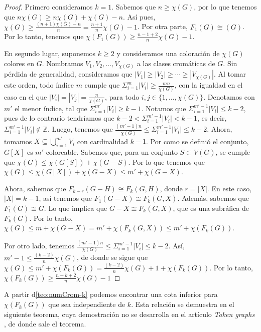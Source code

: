 \begin{proof}
    Primero consideramos $k=1$. Sabemos que $n \geq \chi(G)$, por lo que tenemos
    que $n\chi(G) \geq n\chi(G) + \chi(G) -n$. As\'i pues, $\chi (G) \geq
    \frac{(n+1)\chi(G)-n}{n} = \frac{n+1}{n}\chi (G) -1$. Por otra parte,
    $F_1(G) \cong (G)$. Por lo tanto, tenemos que $\chi(F_1(G)) \geq
    \frac{n-1+2}{n} \chi(G) -1$.
        
    En segundo lugar, suponemos $k \geq 2$ y consideramos una coloraci\'on de
    $\chi(G)$ colores en $G$. Nombramos $V_1, V_2, \dots, V_{\chi(G)}$ a las
    clases crom\'aticas de $G$. Sin p\'erdida de generalidad, consideramos que
    $|V_1|\geq |V_2|\geq \cdots \geq |V_{\chi(G)}|$. Al tomar este orden, todo
    \'indice $m$ cumple que $\Sigma_{i=1}^{m}|V_i| \geq \frac{mn}{\chi(G)}$, con
    la igualdad en el caso en el que $|V_i| = |V_j| = \frac{n}{\chi(G)}$, para
    todo $i,j \in \{1, \dots, \chi(G)\}$. Denotamos con $m'$ el menor \'indice,
    tal que $\Sigma_{i=1}^{m'}|V_i| \geq k-1$. Notamos que
    $\Sigma_{i=1}^{m'-1}|V_i| \leq k-2$, pues de lo contrario tendr\'iamos que
    $k-2<\Sigma_{i=1}^{m'-1}|V_i| < k-1$, es decir, $\Sigma_{i=1}^{m'-1}|V_i|
    \notin \mathbb{Z}$. Luego, tenemos que $\frac{(m'-1)n}{\chi(G)}\leq
    \Sigma_{i=1}^{m'-1}|V_i| \leq k-2$. Ahora, tomamos $X \subseteq
    \bigcup_{i=1}^{m'} V_i$ con cardinalidad $k-1$. Por como se defini\'o el
    conjunto, $G[X]$ es $m'$-coloreable. Sabemos que, para un conjunto $S
    \subset V(G)$, se cumple que $\chi(G) \leq \chi(G[S])+\chi(G-S)$. Por lo que
    tenemos que $\chi(G) \leq \chi(G[X])+\chi(G-X) \leq m' + \chi(G-X)$.

    Ahora, sabemos que $F_{k-r}(G-H) \cong F_k(G,H)$, donde $r = |X|$. En este
    caso, $|X| = k-1$, as\'i tenemos que $F_1(G-X) \cong F_k(G,X)$. Adem\'as,
    sabemos que $F_1(G) \cong G$. Lo que implica que $G-X \cong F_k(G,X)$, que
    es una subr\'afica de $F_k(G)$. Por lo tanto, $\chi(G) \leq m + \chi(G-X) =
    m' + \chi(F_k(G,X)) \leq m' + \chi(F_k(G))$. 
            
    Por otro lado, tenemos $\frac{(m'-1)n}{\chi(G)}\leq \Sigma_{i=1}^{m'-1}|V_i|
    \leq k-2$. As\'i, $m'-1 \leq \frac{(k-2)}{n}\chi(G)$, de donde se sigue que
    $\chi(G) \leq m' + \chi(F_k(G)) = \frac{(k-2)}{n}\chi(G) +1 + \chi(F_k(G))$.
    Por lo tanto, $\chi(F_k(G)) \geq \frac{n-k+2}{n} \chi(G) -1$
\end{proof}

A partir d\cref{teo:numCrom-k} podemos encontrar una cota inferior para
$\chi(F_k(G))$ que sea independiente de $k$. Esta relaci\'on se demuestra en el
siguiente teorema, cuya demostraci\'on no se desarrolla en el art\'iculo
\textit{Token graphs} \cite{fabilaToken}, de donde sale el teorema.


